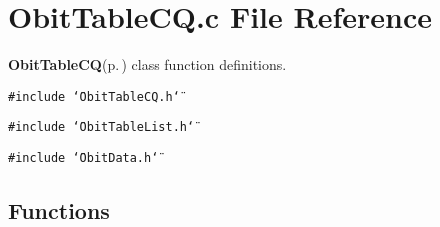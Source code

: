 \section{Obit\-Table\-CQ.c File Reference}
\label{ObitTableCQ_8c}
{\bf Obit\-Table\-CQ}{\rm (p.\,\pageref{structObitTableCQ})} class function definitions. 

{\tt \#include \char`\"{}Obit\-Table\-CQ.h\char`\"{}}\par
{\tt \#include \char`\"{}Obit\-Table\-List.h\char`\"{}}\par
{\tt \#include \char`\"{}Obit\-Data.h\char`\"{}}\par
\subsection*{Functions}
